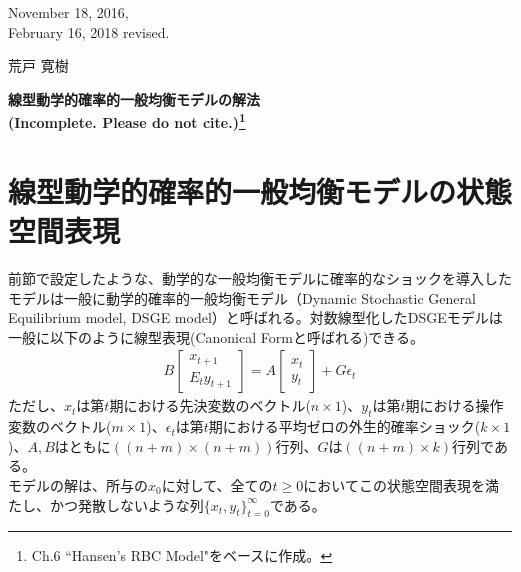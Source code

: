 \documentclass[a4j, dvipdfmx]{jarticle}
\begin{document}
\begin{flushright}
November 18, 2016,\\
February 16, 2018 revised.

荒戸 寛樹
\end{flushright}
\begin{center}
\Large{\textbf{
線型動学的確率的一般均衡モデルの解法 \\ (Incomplete. Please do not cite.)\footnote{\citet{mccan2008:abcs} Ch.6 ``Hansen's RBC Model"をベースに作成。}
}}
\end{center}
\vspace{10pt}
\section{線型動学的確率的一般均衡モデルの状態空間表現}
前節で設定したような、動学的な一般均衡モデルに確率的なショックを導入したモデルは一般に動学的確率的一般均衡モデル（Dynamic Stochastic General Equilibrium model, DSGE model）と呼ばれる。対数線型化したDSGEモデルは一般に以下のように線型表現(Canonical Formと呼ばれる)できる。
\begin{align}
B\begin{bmatrix}x_{t+1}\\E_t y_{t+1}\end{bmatrix} = A\begin{bmatrix}x_t\\y_t\end{bmatrix} + G\epsilon_t\label{ssr}
\end{align}
ただし、$x_t$は第$t$期における先決変数のベクトル($n\times 1$)、$y_t$は第$t$期における操作変数のベクトル($m\times 1$)、$\epsilon_t$は第$t$期における平均ゼロの外生的確率ショック($k\times 1$)、$A, B$はともに$((n+m)\times (n+m))$行列、$G$は$((n+m)\times k)$行列である。\\

モデルの解は、所与の$x_0$に対して、全ての$t\ge0$においてこの状態空間表現を満たし、かつ発散しないような列$\{x_t, y_t\}_{t=0}^\infty$である。
\end{document}
